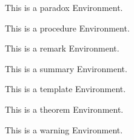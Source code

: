 \documentclass{ximera}
\begin{document}
\begin{paradox}
    This is a paradox Environment.
\end{paradox}%

\begin{procedure}
    This is a procedure Environment.
\end{procedure}%

\begin{remark}
    This is a remark Environment.
\end{remark}%

\begin{summary}
    This is a summary Environment.
\end{summary}%

\begin{template}
    This is a template Environment.
\end{template}%

\begin{theorem}
    This is a theorem Environment.
\end{theorem}%

\begin{warning}
    This is a warning Environment.
\end{warning}%

\hrulefill
\end{document}
